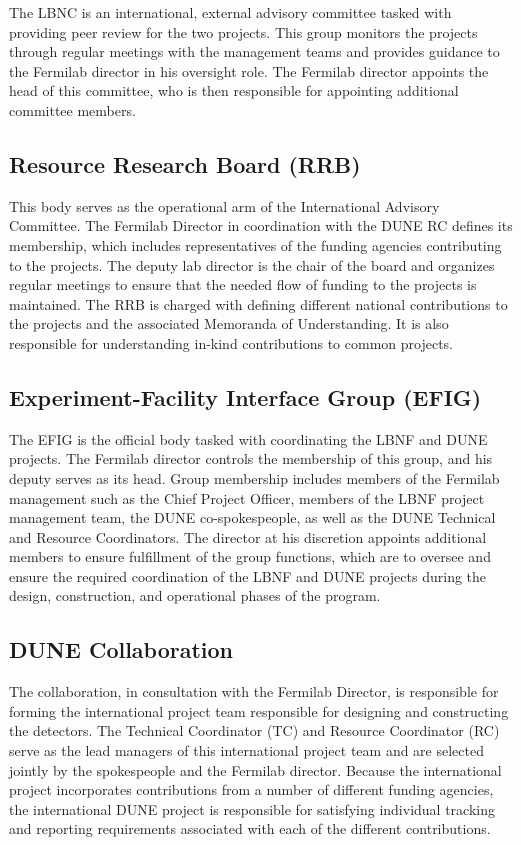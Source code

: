 	The LBNC is an international, external advisory committee tasked with providing peer review for the two projects.  This group monitors the projects through regular meetings with the management teams and provides guidance   to the Fermilab director in his oversight role.  The Fermilab director appoints the head of this committee, who is then responsible for appointing additional committee members. 

\subsection{Resource Research Board (RRB)}

 	This body serves as the operational arm of the International Advisory Committee.  The Fermilab Director in coordination with the DUNE RC defines its membership, which includes representatives of the funding agencies contributing to the projects.  The deputy lab director is the chair of the board and organizes regular meetings to ensure that the needed  flow of funding to the projects is maintained.  The RRB is charged with defining different national contributions to the projects and the associated Memoranda of Understanding.   It is also responsible for understanding in-kind contributions to common projects. 

\subsection{Experiment-Facility Interface Group (EFIG)}

	The EFIG is the official body tasked with coordinating the LBNF and DUNE projects.  The Fermilab director controls the membership of this group, and his deputy serves as its head.  Group membership includes members of the Fermilab management such as the Chief Project Officer, members of the LBNF project management team, the DUNE co-spokespeople, as well as the DUNE Technical and Resource Coordinators.  The director at his discretion appoints additional members to ensure fulfillment of the group functions, which are to oversee and ensure the required coordination of the LBNF and DUNE projects during the design, construction, and operational phases of the program.    
	
\subsection{DUNE Collaboration}	

	The collaboration, in consultation with the Fermilab Director, is responsible for forming the international project team responsible for designing and constructing the detectors.  The Technical Coordinator (TC) and Resource Coordinator (RC) serve as the lead managers of this international project team and are selected jointly by the spokespeople and the Fermilab director.  Because the international project incorporates contributions from a number of different funding agencies, the international DUNE project is responsible for satisfying individual tracking and reporting requirements associated with each of the different contributions.


